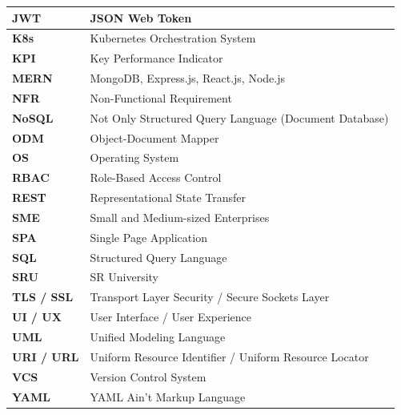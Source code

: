 \begin{table}[h!]
\begin{tabular}{|p{3cm}|p{11.5cm}|}
\textbf{JWT} & JSON Web Token \\ \hline
\textbf{K8s} & Kubernetes Orchestration System \\ \hline
\textbf{KPI} & Key Performance Indicator \\ \hline
\textbf{MERN} & MongoDB, Express.js, React.js, Node.js \\ \hline
\textbf{NFR} & Non-Functional Requirement \\ \hline
\textbf{NoSQL} & Not Only Structured Query Language (Document Database) \\ \hline
\textbf{ODM} & Object-Document Mapper \\ \hline
\textbf{OS} & Operating System \\ \hline
\textbf{RBAC} & Role-Based Access Control \\ \hline
\textbf{REST} & Representational State Transfer \\ \hline
\textbf{SME} & Small and Medium-sized Enterprises \\ \hline
\textbf{SPA} & Single Page Application \\ \hline
\textbf{SQL} & Structured Query Language \\ \hline
\textbf{SRU} & SR University \\ \hline
\textbf{TLS / SSL} & Transport Layer Security / Secure Sockets Layer \\ \hline
\textbf{UI / UX} & User Interface / User Experience \\ \hline
\textbf{UML} & Unified Modeling Language \\ \hline
\textbf{URI / URL} & Uniform Resource Identifier / Uniform Resource Locator \\ \hline
\textbf{VCS} & Version Control System \\ \hline
\textbf{YAML} & YAML Ain't Markup Language \\ \hline
\end{tabular}
\end{table}
